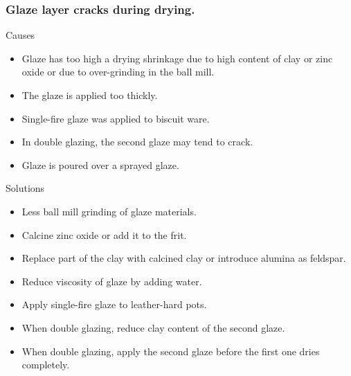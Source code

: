 \subsubsection{Glaze layer cracks during drying.}
Causes
\begin{itemize}
\item Glaze has too high a drying shrinkage due to high content of clay or zinc 
oxide or due to over-grinding in the ball mill.
\item The glaze is applied too thickly.
\item Single-fire glaze was applied to biscuit ware.
\item In double glazing, the second glaze may tend to crack.
\item Glaze is poured over a sprayed glaze.
\end{itemize}
Solutions
\begin{itemize}
\item Less ball mill grinding of glaze materials.
\item Calcine zinc oxide or add it to the frit.
\item Replace part of the clay with calcined clay or introduce alumina 
 as feldspar.
\item Reduce viscosity of glaze by adding water.
\item Apply single-fire glaze to leather-hard pots.
\item When double glazing, reduce clay content of the second glaze.
\item When double glazing, apply the second glaze before the first one dries 
completely.
\end{itemize}
